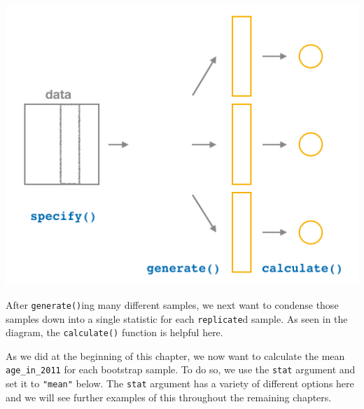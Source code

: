 \documentclass[12pt,]{krantz}
\makeatletter
\newenvironment{Shaded}{\begin{snugshade}}{\end{snugshade}}
\newcommand{\KeywordTok}[1]{\textcolor[rgb]{0.27,0.27,0.27}{\textbf{#1}}}
\newcommand{\DataTypeTok}[1]{\textcolor[rgb]{0.27,0.27,0.27}{#1}}
\newcommand{\DecValTok}[1]{\textcolor[rgb]{0.06,0.06,0.06}{#1}}
\newcommand{\StringTok}[1]{\textcolor[rgb]{0.5,0.5,0.5}{#1}}
\newcommand{\OperatorTok}[1]{\textcolor[rgb]{0.43,0.43,0.43}{\textbf{#1}}}
\newcommand{\NormalTok}[1]{#1}
\newenvironment{kframe}{%
\medskip{}
\setlength{\fboxsep}{.8em}
 \def\at@end@of@kframe{}%
 \ifinner\ifhmode%
  \def\at@end@of@kframe{\end{minipage}}%
  \begin{minipage}{\columnwidth}%
 \fi\fi%
 \def\FrameCommand##1{\hskip\@totalleftmargin \hskip-\fboxsep
 \colorbox{shadecolor}{##1}\hskip-\fboxsep
     \hskip-\linewidth \hskip-\@totalleftmargin \hskip\columnwidth}%
 \MakeFramed {\advance\hsize-\width
   \@totalleftmargin\z@ \linewidth\hsize
   \@setminipage}}%
 {\par\unskip\endMakeFramed%
 \at@end@of@kframe}
\renewenvironment{Shaded}{\begin{kframe}}{\end{kframe}}
\theoremstyle{definition}
\theoremstyle{definition}
\theoremstyle{definition}
\theoremstyle{remark}
\makeatother
\begin{document}
\begin{center}\includegraphics[width=\textwidth]{images/flowcharts/infer/calculate} \end{center}

After \texttt{generate()}ing many different samples, we next want to
condense those samples down into a single statistic for each
\texttt{replicate}d sample. As seen in the diagram, the
\texttt{calculate()} function is helpful here.

As we did at the beginning of this chapter, we now want to calculate the
mean \texttt{age\_in\_2011} for each bootstrap sample. To do so, we use
the \texttt{stat} argument and set it to \texttt{"mean"} below. The
\texttt{stat} argument has a variety of different options here and we
will see further examples of this throughout the remaining chapters.

\begin{Shaded}
\end{Shaded}
\end{document}
